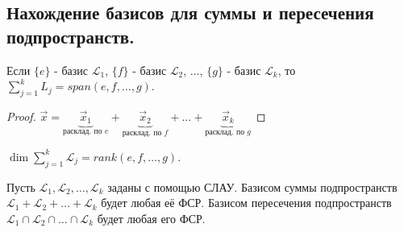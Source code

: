 \subsection{
    Нахождение базисов для суммы и пересечения подпространств.
}

\begin{theorem}
    Если $\{e\}$ - базис $\mathcal{L}_1$, $\{f\}$ - базис $\mathcal{L}_2$, $\ldots$, $\{g\}$ - базис $\mathcal{L}_k$, то $\sum_{j=1}^{k} L_j = span(e, f, \ldots, g)$.
\end{theorem}

\begin{proof}
    $\vec{x} = \underbrace{\vec{x}_1}_{\text{расклад. по $e$}} + \underbrace{\vec{x}_2}_{\text{расклад. по $f$}} + \ldots + \underbrace{\vec{x}_k}_{\text{расклад. по $g$}}$
\end{proof}

\begin{proposition}
    $\dim \sum_{j=1}^{k} \mathcal{L}_j = rank(e, f, \ldots, g)$.
\end{proposition}

Пусть $\mathcal{L}_1, \mathcal{L}_2, \ldots, \mathcal{L}_k$ заданы с помощью СЛАУ. Базисом суммы подпространств $\mathcal{L}_1 + \mathcal{L}_2 + \ldots + \mathcal{L}_k$ будет любая её ФСР. Базисом пересечения подпространств $\mathcal{L}_1 \cap \mathcal{L}_2 \cap \ldots \cap \mathcal{L}_k$ будет любая его ФСР.
